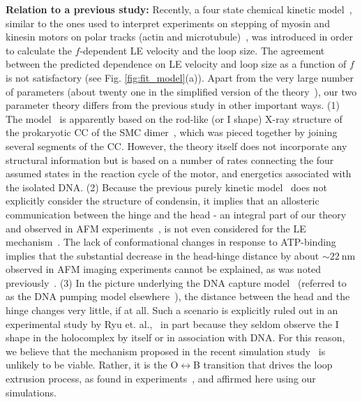 \documentclass[fleqn,10pt]{wlscirep}
\newcommand{\nm}{\ \mathrm{nm}}
\begin{document}
{\bf Relation to a previous study:} 
Recently, a four state chemical kinetic model~\cite{marko2019dna}, similar to the ones used to  interpret experiments on stepping of myosin and kinesin motors on polar tracks (actin and microtubule)~\cite{mugnai2020theoretical,kolomeisky2007molecular}, was introduced in order to calculate the $f$-dependent LE velocity and the loop size. The agreement between the predicted dependence on LE velocity and loop size as a function of $f$ is not satisfactory (see Fig. \ref{fig:fit_model}(a)).  Apart from the very large number of parameters (about twenty one in the simplified version of the theory~\cite{marko2019dna}), our two parameter theory differs from the previous study in other important ways. (1) The model~\cite{marko2019dna} is apparently based on the rod-like (or I shape) X-ray structure of the prokaryotic CC of the SMC dimer~\cite{diebold2017structure}, which was pieced together by joining several segments of the CC.  However, the theory itself does not incorporate any structural information but is based on a number of rates connecting the four assumed states in the reaction cycle of the motor, and energetics associated with the isolated DNA.  (2) Because the previous purely kinetic model~\cite{marko2019dna} does not explicitly consider the structure of condensin, it implies that an allosteric communication between the hinge and the head - an integral part of our theory and observed in AFM experiments~\cite{eeftens2016condensin}, is not even considered for the LE mechanism~\cite{marko2019dna}.  The lack of conformational changes in response to ATP-binding implies that the substantial decrease in the head-hinge distance by about $\sim 22\nm$ observed in AFM imaging experiments cannot be explained, as was noted previously~\cite{ryu2020condensin}.  (3) In the picture underlying the DNA capture model~\cite{marko2019dna} (referred to as the DNA pumping model elsewhere~\cite{ryu2020condensin}), the distance between the head and the hinge changes very little, if at all. Such a scenario is explicitly ruled out in an experimental study by Ryu et.  al.,~\cite{ryu2020condensin} in part because they seldom observe the I shape in the holocomplex by itself or in association with DNA. For this reason, we believe that the mechanism proposed in the recent simulation study~\cite{nomidis2021dna} is unlikely to be viable. Rather, it is the O$\leftrightarrow$B transition that drives the loop extrusion process, as found in experiments~\cite{ryu2020condensin}, and affirmed here using our simulations. 
\end{document}
